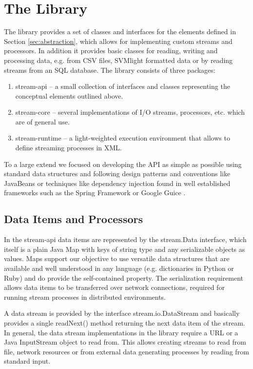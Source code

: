 \section{\label{sec:streamsLibrary}The \streams Library}
The \streams library provides a set of classes and interfaces for the
elements defined in Section \ref{sec:abstraction}, which allows for
implementing custom streams and processors. In addition it provides
basic classes for reading, writing and processing data, e.g. from CSV
files, SVMlight formatted data or by reading streams from an SQL
database. The library consists of three packages:
\begin{enumerate}
\item \textsf{stream-api} -- a small collection of interfaces and classes
  representing the conceptual elements outlined above.
\item \textsf{stream-core} -- several implementations of I/O streams,
  processors, etc. which are of general use.
\item \textsf{stream-runtime} -- a light-weighted execution environment
  that allows to define streaming processes in XML.
\end{enumerate}
To a large extend we focused on developing the \streams API as simple
as possible using standard data structures and following design
patterns and conventions like JavaBeans \cite{javabeans} or techniques
like dependency injection \cite{dependencyInjection} found in well
established frameworks such as the Spring Framework
\cite{springframework} or Google Guice \cite{guice}.

\subsection{Data Items and Processors}
In the \textsf{stream-api} data items are represented by the
{\ttfamily stream.Data} interface, which itself is a plain Java
{\ttfamily Map} with keys of string type and any serializable objects
as values. Maps support our objective to use versatile data structures
that are available and well understood in any language
(e.g. dictionaries in Python or Ruby) and do provide the
self-contained property. The serialization requirement allows data
items to be transferred over network connections, required for running
stream processes in distributed environments.

A data stream is provided by the interface {\ttfamily
  stream.io.DataStream} and basically provides a single {\ttfamily
  readNext()} method returning the next data item of the stream. In
general, the data stream implementations in the \streams library
require a URL or a Java {\ttfamily InputStream} object to read from.
This allows creating streams to read from file, network resources or
from external data generating processes by reading from standard
input.

